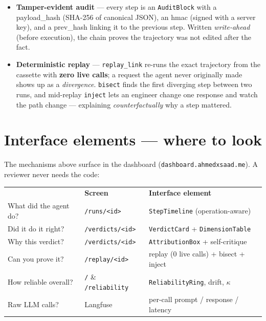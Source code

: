 \documentclass[11pt]{article}
\newcommand{\fld}[1]{{\ttfamily\color{emdark}#1}}
\begin{document}
\begin{itemize}[leftmargin=1.3em,itemsep=2pt]
  \item \textbf{Tamper-evident audit} --- every step is an \texttt{AuditBlock} with a
        \fld{payload\_hash} (SHA-256 of canonical JSON), an \fld{hmac} (signed with a server
        key), and a \fld{prev\_hash} linking it to the previous step. Written \emph{write-ahead}
        (before execution), the chain proves the trajectory was not edited after the fact.
  \item \textbf{Deterministic replay} --- \texttt{replay\_link} re-runs the exact trajectory
        from the cassette with \textbf{zero live calls}; a request the agent never originally
        made shows up as a \emph{divergence}. \texttt{bisect} finds the first diverging step
        between two runs, and mid-replay \texttt{inject} lets an engineer change one response and
        watch the path change --- explaining \emph{counterfactually} why a step mattered.
\end{itemize}

\section{Interface elements --- where to look}
The mechanisms above surface in the dashboard (\texttt{dashboard.ahmedxsaad.me}). A reviewer
never needs the code:

\begin{center}
\begin{tabular}{@{}p{5.4cm} p{4.0cm} p{5.4cm}@{}}
\toprule
\rowcolor{headerbg}\multicolumn{1}{@{}>{\bfseries\color{white}}l}{Question} & \color{white}\bfseries Screen & \color{white}\bfseries Interface element \\
What did the agent do? & \texttt{/runs/<id>} & \texttt{StepTimeline} (operation-aware) \\
Did it do it right? & \texttt{/verdicts/<id>} & \texttt{VerdictCard} + \texttt{DimensionTable} \\
Why this verdict? & \texttt{/verdicts/<id>} & \texttt{AttributionBox} + self-critique \\
Can you prove it? & \texttt{/replay/<id>} & replay (0 live calls) + bisect + inject \\
How reliable overall? & \texttt{/} \& \texttt{/reliability} & \texttt{ReliabilityRing}, drift, $\kappa$ \\
Raw LLM calls? & Langfuse & per-call prompt / response / latency \\
\bottomrule
\end{tabular}
\end{center}
\end{document}
